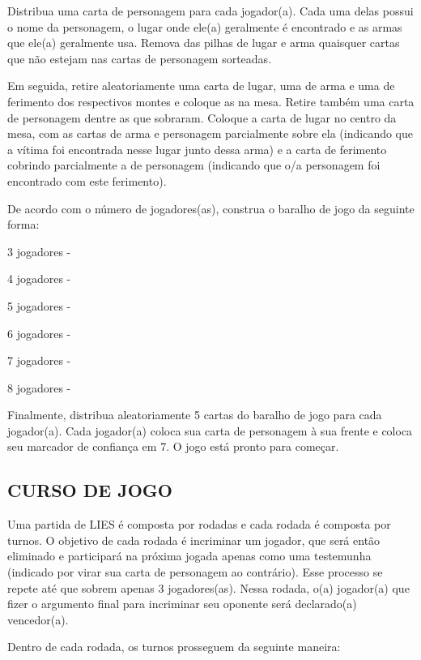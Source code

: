 \documentclass[a4paper, 11pt]{article}
\begin{document}
	Distribua uma carta de personagem para cada jogador(a). Cada uma delas possui o nome da personagem, o lugar onde ele(a) geralmente é encontrado e as armas que ele(a) geralmente usa. Remova das pilhas de lugar e arma quaisquer cartas que não estejam nas cartas de personagem sorteadas.


	Em seguida, retire aleatoriamente uma carta de lugar, uma de arma e uma de ferimento dos respectivos montes e coloque as na mesa. Retire também uma carta de personagem dentre as que sobraram. Coloque a carta de lugar no centro da mesa, com as cartas de arma e personagem parcialmente sobre ela (indicando que a vítima foi encontrada nesse lugar junto dessa arma) e a carta de ferimento cobrindo parcialmente a de personagem (indicando que o/a personagem foi encontrado com este ferimento).

	De acordo com o número de jogadores(as), construa o baralho de jogo da seguinte forma:


	3 jogadores - 

	4 jogadores - 

	5 jogadores - 

	6 jogadores - 

	7 jogadores  - 

	8 jogadores - 

	Finalmente, distribua aleatoriamente 5 cartas do baralho de jogo para cada jogador(a). Cada jogador(a) coloca sua carta de personagem à sua frente e coloca seu marcador de confiança em 7. O jogo está pronto para começar.

\subsection*{CURSO DE JOGO}

	Uma partida de LIES é composta por rodadas e cada rodada é composta por turnos. O objetivo de cada rodada é incriminar um jogador, que será então eliminado e participará na próxima jogada apenas como uma testemunha (indicado por virar sua carta de personagem ao contrário). Esse processo se repete até que sobrem apenas 3 jogadores(as). Nessa rodada, o(a) jogador(a) que fizer o argumento final para incriminar seu oponente será declarado(a) vencedor(a).

	Dentro de cada rodada, os turnos prosseguem da seguinte maneira:
\end{document}
